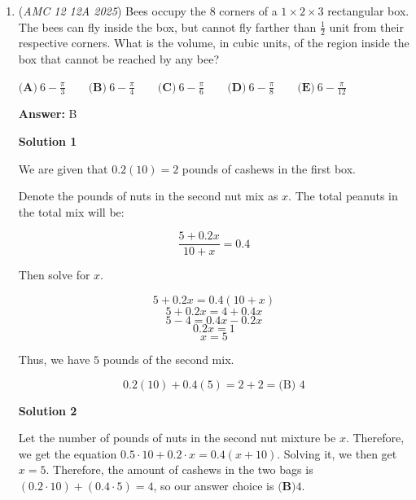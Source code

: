 \begin{enumerate}
 \( t = 3 \).

 \begin{verbatim}
\href{https://youtu.be/LN5ofIcs1kY}{https://youtu.be/LN5ofIcs1kY} 
\end{verbatim}

\begin{verbatim}
\href{https://youtu.be/c-UDo53KwFU}{https://youtu.be/c-UDo53KwFU}
\end{verbatim}

\textbf{Easy Solution} 


	\item (\textit{AMC 12 12A 2025}) Bees occupy the $8$ corners of a $1 \times 2 \times 3$ rectangular box. The bees can fly inside the box, but cannot fly farther than $\frac{1}{2}$ unit from their respective corners. What is the volume, in cubic units, of the region inside the box that cannot be reached by any bee?


 $\textbf{(A)}\   6 - \frac{\pi}{3}  \qquad                 \textbf{(B)}\   6 - \frac{\pi}{4}  \qquad                 \textbf{(C)}\   6 - \frac{\pi}{6}  \qquad                 \textbf{(D)}\   6 - \frac{\pi}{8}  \qquad                 \textbf{(E)}\   6 - \frac{\pi}{12}$

 \textbf{Answer: }B



\textbf{Solution 1}

We are given that $0.2(10) = 2$ pounds of cashews in the first box.

 Denote the pounds of nuts in the second nut mix as $x.$ The total peanuts in the total mix will be:

 
 \[\frac{5 + 0.2x}{10 + x} = 0.4\]

 Then solve for $x.$

 \[5 + 0.2x = 0.4(10 + x)\]
 \[5 + 0.2x = 4 + 0.4x\]
 \[5 - 4 = 0.4x - 0.2x\]
 \[0.2x = 1\]
 \[x = 5\]

 Thus, we have $5$ pounds of the second mix. 

 
 \[0.2(10) + 0.4(5) = 2 + 2 = \boxed{\text{(B) }4}\]




\textbf{Solution 2}

Let the number of pounds of nuts in the second nut mixture be $x$. Therefore, we get the equation $0.5 \cdot 10 + 0.2 \cdot x = 0.4(x+10)$. Solving it, we then get $x=5$. Therefore, the amount of cashews in the two bags is $(0.2 \cdot 10) + (0.4 \cdot 5) = 4$, so our answer choice is $\boxed{\textbf{(B)} 4}$.


\end{enumerate}

